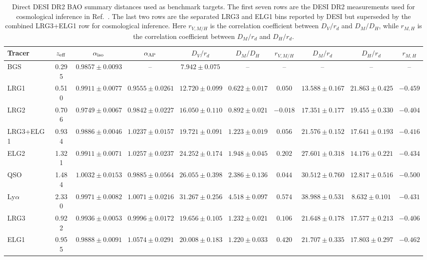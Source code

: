 \documentclass[aps,prd,reprint,nofootinbib,superscriptaddress,longbibliography]{revtex4-2}
\begin{document}
\begin{table}[t]
\footnotesize
\caption{Direct DESI DR2 BAO summary distances used as benchmark targets.  The first seven rows are the DESI DR2 measurements used for cosmological inference in Ref.~\cite{DESIDR2}.  The last two rows are the separated LRG3 and ELG1 bins reported by DESI but superseded by the combined LRG3+ELG1 row for cosmological inference.  Here $r_{V,M/H}$ is the correlation coefficient between $D_V/r_d$ and $D_M/D_H$, while $r_{M,H}$ is the correlation coefficient between $D_M/r_d$ and $D_H/r_d$.}
\begin{ruledtabular}
\begin{tabular}{lccccccccc}
Tracer & $z_{\rm eff}$ & $\alpha_{\rm iso}$ & $\alpha_{\rm AP}$ & $D_V/r_d$ & $D_M/D_H$ & $r_{V,M/H}$ & $D_M/r_d$ & $D_H/r_d$ & $r_{M,H}$ \\
\hline
BGS & 0.295 & $0.9857\pm0.0093$ & -- & $7.942\pm0.075$ & -- & -- & -- & -- & -- \\
LRG1 & 0.510 & $0.9911\pm0.0077$ & $0.9555\pm0.0261$ & $12.720\pm0.099$ & $0.622\pm0.017$ & $0.050$ & $13.588\pm0.167$ & $21.863\pm0.425$ & $-0.459$ \\
LRG2 & 0.706 & $0.9749\pm0.0067$ & $0.9842\pm0.0227$ & $16.050\pm0.110$ & $0.892\pm0.021$ & $-0.018$ & $17.351\pm0.177$ & $19.455\pm0.330$ & $-0.404$ \\
LRG3+ELG1 & 0.934 & $0.9886\pm0.0046$ & $1.0237\pm0.0157$ & $19.721\pm0.091$ & $1.223\pm0.019$ & $0.056$ & $21.576\pm0.152$ & $17.641\pm0.193$ & $-0.416$ \\
ELG2 & 1.321 & $0.9911\pm0.0071$ & $1.0257\pm0.0237$ & $24.252\pm0.174$ & $1.948\pm0.045$ & $0.202$ & $27.601\pm0.318$ & $14.176\pm0.221$ & $-0.434$ \\
QSO & 1.484 & $1.0032\pm0.0153$ & $0.9885\pm0.0564$ & $26.055\pm0.398$ & $2.386\pm0.136$ & $0.044$ & $30.512\pm0.760$ & $12.817\pm0.516$ & $-0.500$ \\
Ly$\alpha$ & 2.330 & $0.9971\pm0.0082$ & $1.0071\pm0.0216$ & $31.267\pm0.256$ & $4.518\pm0.097$ & $0.574$ & $38.988\pm0.531$ & $8.632\pm0.101$ & $-0.431$ \\
LRG3 & 0.922 & $0.9936\pm0.0053$ & $0.9996\pm0.0172$ & $19.656\pm0.105$ & $1.232\pm0.021$ & $0.106$ & $21.648\pm0.178$ & $17.577\pm0.213$ & $-0.406$ \\
ELG1 & 0.955 & $0.9888\pm0.0091$ & $1.0574\pm0.0291$ & $20.008\pm0.183$ & $1.220\pm0.033$ & $0.420$ & $21.707\pm0.335$ & $17.803\pm0.297$ & $-0.462$ \\
\end{tabular}
\end{ruledtabular}
\label{tab:desi_bao_dr2}
\end{table}
\end{document}
